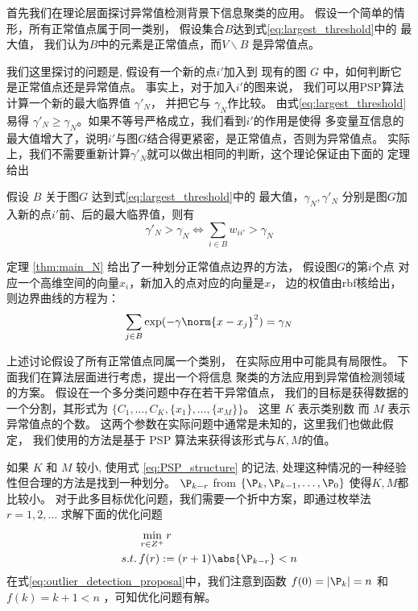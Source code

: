 首先我们在理论层面探讨异常值检测背景下信息聚类的应用。
假设一个简单的情形，所有正常值点属于同一类别，
假设集合$B$达到式\eqref{eq:largest_threshold}中的
最大值，
我们认为$B$中的元素是正常值点，而$V\backslash B$ 是异常值点。

我们这里探讨的问题是, 假设有一个新的点$i'$加入到
现有的图 $G$ 中，如何判断它是正常值点还是异常值点。 
事实上，对于加入$i'$的图来说，
我们可以用PSP算法计算一个新的最大临界值
$\gamma'_N$，
并把它与 $\gamma_N$作比较。 由式\eqref{eq:largest_threshold}易得
$\gamma'_N \geq \gamma_N$。如果不等号严格成立，我们看到$i'$的作用是使得
多变量互信息的最大值增大了，说明$i'$与图$G$结合得更紧密，是正常值点，否则为异常值点。
实际上，我们不需要重新计算$\gamma'_N$就可以做出相同的判断，这个理论保证由下面的
定理给出
\begin{theorem}\label{thm:main_N}
  假设 $B$ 关于图$G$ 达到式\eqref{eq:largest_threshold}中的
  最大值，$\gamma_N, \gamma'_N$ 分别是图$G$加入新的点$i'$前、后的最大临界值，则有
\begin{equation}
\gamma'_N > \gamma_N \iff  \sum_{i \in B} w_{ii'} > \gamma_N 
\end{equation}
\end{theorem}
定理 \ref{thm:main_N} 给出了一种划分正常值点边界的方法，
假设图$G$的第$i$个点
对应一个高维空间的向量$x_i$，新加入的点对应的向量是$x$，
边的权值由rbf核给出，则边界曲线的方程为：
\begin{equation}\label{eq:sum_exp_gamma_N}
  \sum_{j \in B} \exp(-\gamma \norm{x - x_j}^2)= \gamma_N
\end{equation}

上述讨论假设了所有正常值点同属一个类别，
在实际应用中可能具有局限性。
下面我们在算法层面进行考虑，提出一个将信息
聚类的方法应用到异常值检测领域的方案。
假设在一个多分类问题中存在若干异常值点，
我们的目标是获得数据的一个分割，其形式为
$\{C_1, \dots, C_K, \{x_1\}, \dots, \{x_M\}\}$。
这里 $K$ 表示类别数 而 $M$ 表示异常值点的个数。
这两个参数在实际问题中通常是未知的，这里我们也做此假定，
我们使用的方法是基于 PSP 算法来获得该形式与$K, M$的值。

如果 $K$ 和 $M$ 较小, 使用式 \eqref{eq:PSP_structure}
的记法, 处理这种情况的一种经验性但合理的方法是找到一种划分。
$\P_{k-r}$ from  $\{\P_k, \P_{k-1}, \dots, \P_0\}$ 使得$K,M$都比较小。
对于此多目标优化问题，我们需要一个折中方案，即通过枚举法$r=1,2,\dots$ 求解下面的优化问题
\begin{align}\label{eq:outlier_detection_proposal}
& \min_{r\in Z^+} r \\
s.t.\, & f(r):=(r+1)\abs{\P_{k-r}} < n
\end{align}
在式\eqref{eq:outlier_detection_proposal}中，我们注意到函数
$f(0)=|\P_k|=n$ 和 $f(k)=k+1<n$ ，可知优化问题有解。

